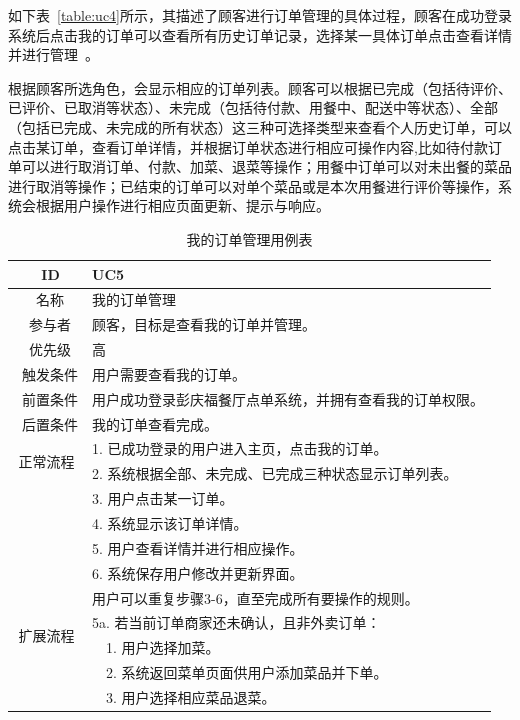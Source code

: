 如下表~\ref{table:uc4}所示，其描述了顾客进行订单管理的具体过程，顾客在成功登录系统后点击我的订单可以查看所有历史订单记录，选择某一具体订单点击查看详情并进行管理~\cite{zh2015}。

根据顾客所选角色，会显示相应的订单列表。顾客可以根据已完成（包括待评价、已评价、已取消等状态）、未完成（包括待付款、用餐中、配送中等状态）、全部（包括已完成、未完成的所有状态）这三种可选择类型来查看个人历史订单，可以点击某订单，查看订单详情，并根据订单状态进行相应可操作内容,比如待付款订单可以进行取消订单、付款、加菜、退菜等操作；用餐中订单可以对未出餐的菜品进行取消等操作；已结束的订单可以对单个菜品或是本次用餐进行评价等操作，系统会根据用户操作进行相应页面更新、提示与响应。

\begin{table}[htbp!]
  \footnotesize
  \centering
  \caption{我的订单管理用例表}
  \vspace{2mm}
  \begin{tabular}{cp{11.5cm}}
   \hline
   \ ID & UC5 \\ 
   \hline
   \ 名称 & 我的订单管理 \\ 
   \hline
   \ 参与者 & 顾客，目标是查看我的订单并管理。 \\ 
   \hline
   \ 优先级 & 高 \\ 
   \hline
   \ 触发条件 & 用户需要查看我的订单。 \\ 
   \hline
   \ 前置条件 & 用户成功登录彭庆福餐厅点单系统，并拥有查看我的订单权限。 \\ 
   \hline
   \ 后置条件 & 我的订单查看完成。 \\ 
   \hline
   \multirow{2}{*}{正常流程}
    & 1.	已成功登录的用户进入主页，点击我的订单。\\
    & 2.	系统根据全部、未完成、已完成三种状态显示订单列表。\\
    & 3.	用户点击某一订单。\\
    & 4.	系统显示该订单详情。\\
    & 5.  用户查看详情并进行相应操作。\\
    & 6.  系统保存用户修改并更新界面。\\
    & 用户可以重复步骤3-6，直至完成所有要操作的规则。\\
   \hline
   \multirow{2}{*}{扩展流程}
    & 5a. 若当前订单商家还未确认，且非外卖订单：\\
    & ~~1.	用户选择加菜。\\
    & ~~2.	系统返回菜单页面供用户添加菜品并下单。\\
    & ~~3.	用户选择相应菜品退菜。\\

\end{tabular}
\end{table}
